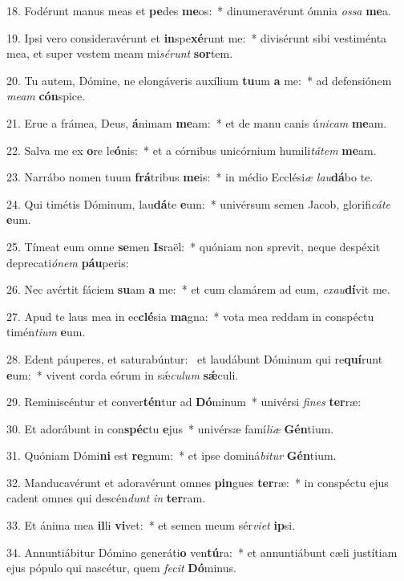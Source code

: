 18. Fodérunt manus meas et \textbf{pe}des \textbf{me}os:~*  dinumeravérunt ómnia \textit{os}\textit{sa} \textbf{me}a.\

19. Ipsi vero consideravérunt et \textbf{in}spe\textbf{xé}runt me:~*  divisérunt sibi vestiménta mea, et super vestem meam mi\textit{sé}\textit{runt} \textbf{sor}tem.\

20. Tu autem, Dómine, ne elongáveris auxílium \textbf{tu}um \textbf{a} me:~*  ad defensiónem \textit{me}\textit{am} \textbf{cón}spice.\

21. Erue a frámea, Deus, \textbf{á}nimam \textbf{me}am:~*  et de manu canis ú\textit{ni}\textit{cam} \textbf{me}am.\

22. Salva me ex \textbf{o}re le\textbf{ó}nis:~*  et a córnibus unicórnium humili\textit{tá}\textit{tem} \textbf{me}am.\

23. Narrábo nomen tuum \textbf{frá}tribus \textbf{me}is:~*  in médio Ecclési\textit{æ} \textit{lau}\textbf{dá}bo te.\

24. Qui timétis Dóminum, lau\textbf{dá}te \textbf{e}um:~*  univérsum semen Jacob, glorifi\textit{cá}\textit{te} \textbf{e}um.\

25. Tímeat eum omne \textbf{se}men \textbf{Is}raël:~*  quóniam non sprevit, neque despéxit deprecati\textit{ó}\textit{nem} \textbf{páu}peris:\

26. Nec avértit fáciem \textbf{su}am \textbf{a} me:~*  et cum clamárem ad eum, \textit{ex}\textit{au}\textbf{dí}vit me.\

27. Apud te laus mea in ec\textbf{clé}sia \textbf{ma}gna:~*  vota mea reddam in conspéctu timén\textit{ti}\textit{um} \textbf{e}um.\

28. Edent páuperes, et saturabúntur: \dag\  et laudábunt Dóminum qui re\textbf{quí}runt \textbf{e}um:~*  vivent corda eórum in sǽ\textit{cu}\textit{lum} \textbf{sǽ}culi.\

29. Reminiscéntur et conver\textbf{tén}tur ad \textbf{Dó}minum~*  univérsi \textit{fi}\textit{nes} \textbf{ter}ræ:\

30. Et adorábunt in con\textbf{spéc}tu \textbf{e}jus~*  univérsæ famí\textit{li}\textit{æ} \textbf{Gén}tium.\

31. Quóniam Dómi\textbf{ni} est \textbf{re}gnum:~*  et ipse dominá\textit{bi}\textit{tur} \textbf{Gén}tium.\

32. Manducavérunt et adoravérunt omnes \textbf{pin}gues \textbf{ter}ræ:~*  in conspéctu ejus cadent omnes qui descén\textit{dunt} \textit{in} \textbf{ter}ram.\

33. Et ánima mea \textbf{il}li \textbf{vi}vet:~*  et semen meum sér\textit{vi}\textit{et} \textbf{ip}si.\

34. Annuntiábitur Dómino generáti\textbf{o} ven\textbf{tú}ra:~*  et annuntiábunt cæli justítiam ejus pópulo qui nascétur, quem \textit{fe}\textit{cit} \textbf{Dó}minus.\

